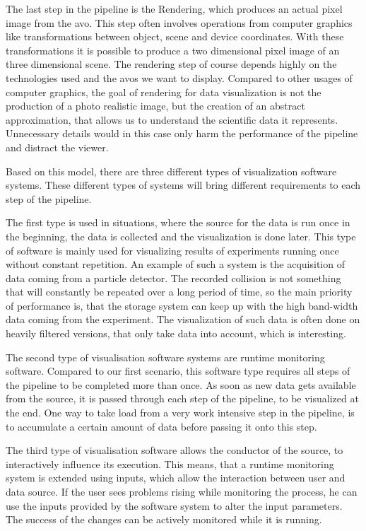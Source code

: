 The last step in the pipeline is the Rendering, which produces an actual pixel
image from the \gls{avo}. This step often involves operations from computer
graphics like transformations between object, scene and device coordinates. With
these transformations it is possible to produce a two dimensional pixel image of
an three dimensional scene. The rendering step of course depends highly on the
technologies used and the \glspl{avo} we want to display. Compared to other
usages of computer graphics, the goal of rendering for data visualization is not
the production of a photo realistic image, but the creation of an abstract
approximation, that allows us to understand the scientific data it represents.
Unnecessary details would in this case only harm the performance of the pipeline
and distract the viewer. 
\cite{VisIdioms, UnderstDataThroughVis}

Based on this model, there are three different types of visualization software
systems. These different types of systems will bring different requirements to
each step of the pipeline.

The first type is used in situations, where the source for the data is run once
in the beginning, the data is collected and the visualization is done later.
This type of software is mainly used for visualizing results of experiments
running once without constant repetition. An example of such a system is the
acquisition of data coming from a particle detector. The recorded collision is
not something that will constantly be repeated over a long period of time, so
the main priority of performance is, that the storage system can keep up with
the high band-width data coming from the experiment. The visualization of such
data is often done on heavily filtered versions, that only take data into
account, which is interesting.

The second type of visualisation software systems are runtime monitoring
software. Compared to our first scenario, this software type requires all steps
of the pipeline to be completed more than once. As soon as new data gets
available from the source, it is passed through each step of the pipeline, to be
visualized at the end. One way to take load from a very work intensive step in
the pipeline, is to accumulate a certain amount of data before passing it onto
this step.

The third type of visualisation software allows the conductor of the source, to
interactively influence its execution. This means, that a runtime monitoring
system is extended using inputs, which allow the interaction between user and
data source. If the user sees problems rising while monitoring the process, he
can use the inputs provided by the software system to alter the input
parameters. The success of the changes can be actively monitored while it is
running.
\cite{VisIdioms}

